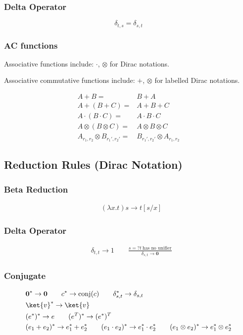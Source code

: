 \subsubsection*{Delta Operator}
$$
    \delta_{t, s} = \delta_{s, t}
$$

\subsubsection*{AC functions}

Associative functions include: $\cdot$, $\otimes$ for Dirac notations. 

Associative commutative functions include: $+$, $\otimes$ for labelled Dirac notations.

\begin{align*}
    A + B = & B + A \\
    A + (B + C) = & A + B + C \\
    A \cdot (B \cdot C) = & A \cdot B \cdot C \\
    A \otimes (B \otimes C) = & A \otimes B \otimes C \\
    A_{r_1, r_2} \otimes B_{r_1', r_2'} = & B_{r_1', r_2'} \otimes A_{r_1, r_2}
\end{align*}


\subsection{Reduction Rules (Dirac Notation)}

\subsubsection*{Beta Reduction}
\begin{align*}
    & (\lambda x.t) s \to t[s/x]
\end{align*}


\subsubsection*{Delta Operator}
\begin{align*}
  & \delta_{t, t} \to 1
  \qquad
  \frac{s =? t\ \textrm{has no unifier}}{\delta_{s, t} \to \mathbf{0}}
\end{align*}

\subsubsection*{Conjugate}
\begin{align*}
  & \textbf{0}^* \to \textbf{0}
  \qquad 
  c^* \to \mathrm{conj}(c)
  \qquad 
  \delta_{s,t}^* \to \delta_{s,t}\\
  & \ket{v}^* \to \ket{v} \\
  & (e^*)^* \to e
  \qquad 
  (e^T)^* \to (e^*)^T\\
  & (e_1 + e_2)^* \to e_1^* + e_2^* 
  \qquad (e_1 \cdot e_2)^* \to e_1^* \cdot e_2^* 
  \qquad (e_1 \otimes e_2)^* \to e_1^* \otimes e_2^*
\end{align*}

